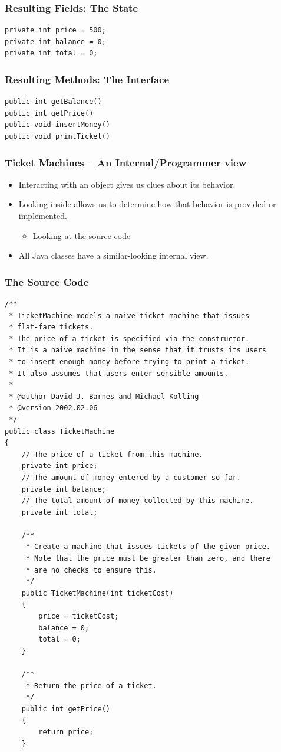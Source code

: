 \begin{frame}[fragile]
\frametitle{Resulting Fields: The State}
\codelist
\begin{lstlisting}[linewidth=5cm]
private int price = 500;
private int balance = 0;
private int total = 0;
\end{lstlisting}
\end{frame}

\begin{frame}[fragile]
\frametitle{Resulting Methods: The Interface}
\codelist
\begin{lstlisting}[linewidth=7cm]
public int getBalance()
public int getPrice()
public void insertMoney()
public void printTicket()
\end{lstlisting}
\end{frame}

\begin{frame}
\frametitle{Ticket Machines – An Internal/Programmer view}
\begin{itemize}
\item Interacting with an object gives us clues about its behavior.
\item Looking inside allows us to determine how that behavior is provided or implemented.
\begin{itemize}
\item Looking at the source code
\end{itemize}
\item All Java classes have a similar-looking internal view.
\end{itemize}
\end{frame}

\begin{frame}[fragile]
\frametitle{The Source Code}
\codelist
\codesmall
\begin{lstlisting}
/**
 * TicketMachine models a naive ticket machine that issues
 * flat-fare tickets.
 * The price of a ticket is specified via the constructor.
 * It is a naive machine in the sense that it trusts its users
 * to insert enough money before trying to print a ticket.
 * It also assumes that users enter sensible amounts.
 *
 * @author David J. Barnes and Michael Kolling
 * @version 2002.02.06
 */
public class TicketMachine
{
    // The price of a ticket from this machine.
    private int price;
    // The amount of money entered by a customer so far.
    private int balance;
    // The total amount of money collected by this machine.
    private int total;

    /**
     * Create a machine that issues tickets of the given price.
     * Note that the price must be greater than zero, and there
     * are no checks to ensure this.
     */
    public TicketMachine(int ticketCost)
    {
        price = ticketCost;
        balance = 0;
        total = 0;
    }

    /**
     * Return the price of a ticket.
     */
    public int getPrice()
    {
        return price;
    }
\end{lstlisting}
\end{frame}



